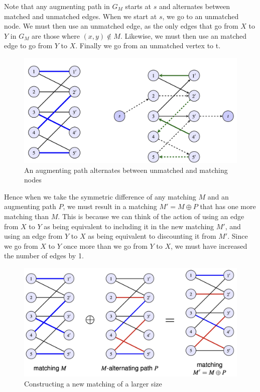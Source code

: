 \documentclass{article}
\theoremstyle{plain}
\theoremstyle{definition}
\begin{document}
    Note that any augmenting path in $G_M$ starts at $s$ and alternates between matched and unmatched edges. When we start at $s$, we go to an unmatched node. We must then use an unmatched edge, as the only edges that go from $X$ to $Y$ in $G_M$ are those where $(x,y) \notin M$. Likewise, we must then use an matched edge to go from $Y$ to $X$. Finally we go from an unmatched vertex to t. \begin{figure}
        \centering
        \includegraphics[width=\linewidth]{images/alternatingpath.png}
        \caption{An augmenting path alternates between unmatched and matching nodes}
        \label{fig:alternatingdiff}
    \end{figure}
    Hence when we take the symmetric difference of any matching $M$ and an augmenting path $P$, we must result in a matching $M' = M \oplus P$ that has one more matching than $M$. This is because we can think of the action of using an edge from $X$ to $Y$ as being equivalent to including it in the new matching $M'$, and using an edge from $Y$ to $X$ as being equivalent to discounting it from $M'$. Since we go from $X$ to $Y$ once more than we go from $Y$ to $X$, we must have increased the number of edges by 1. 
    \begin{figure}
        \centering
        \includegraphics[width=\linewidth]{images/augmentingdiff.png}
        \caption{Constructing a new matching of a larger size}
        \label{fig:augmentingdiff}
    \end{figure}
\end{document}
